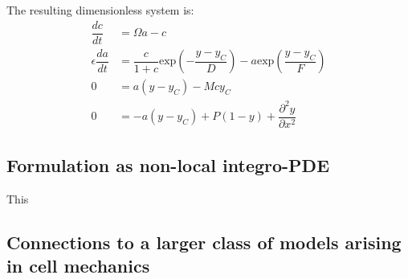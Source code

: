 The resulting dimensionless system is:
\begin{align}
\dfrac{dc}{dt}  & =  \Omega a - c\label{eq::nondimc}\\
\epsilon\dfrac{da}{ dt}  & =  \dfrac{c}{1+c} \mbox{exp}\left(-\dfrac{y-y_C}{D}\right) - a \mbox{exp} \left(\dfrac{y-y_C}{F} \right)\label{eq::nondima}\\
0 & = a(y-y_C) - Mcy_C\label{eq::nondimyC}\\
0 & = -a(y - y_C) + P (1-y) + \dfrac{\partial^2 y}{\partial x^2}\label{eq::nondimyM}
\end{align}

\subsection{Formulation as non-local integro-PDE}
This 
\subsection{Connections to a larger class of models arising in cell mechanics}
